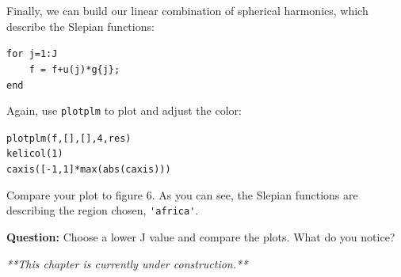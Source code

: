 \documentclass[11pt]{article}
\begin{document}
Finally, we can build our linear combination of spherical harmonics, which describe the Slepian functions:

\verb+for j=1:J+\\
\verb|    f = f+u(j)*g{j};|\\   
\verb+end+

Again, use \verb+plotplm+ to plot and adjust the color:

\verb+plotplm(f,[],[],4,res)+\\
\verb+kelicol(1)+\\
\verb+caxis([-1,1]*max(abs(caxis)))+

Compare your plot to figure 6.  As  you can see, the Slepian functions are describing the region chosen, \verb|'africa'|.  

\textbf{Question:} Choose a lower J value and compare the plots.  What do you notice?



\textit{**This chapter is currently under construction.**}
\end{document}
